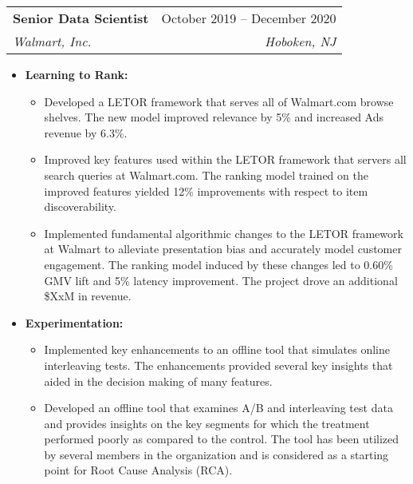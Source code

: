 \documentclass[letterpaper,11pt]{article}
\makeatletter
\newcommand{\resumeItem}[1]{
  \item\small{
    {#1 \vspace{-2pt}}
  }
}
\newcommand{\resumeSubheading}[4]{
  \vspace{-2pt}\item
    \begin{tabular*}{0.97\textwidth}[t]{l@{\extracolsep{\fill}}r}
      \textbf{#1} & #2 \\
      \textit{\small#3} & \textit{\small #4} \\
    \end{tabular*}\vspace{-7pt}
}
\newcommand{\resumeItemListStart}{\begin{itemize}}
\newcommand{\resumeItemListEnd}{\end{itemize}\vspace{-4.5pt}}
\makeatother
\begin{document}
      \vspace{2mm}
       \resumeSubheading
      {Senior Data Scientist}{October 2019 -- December 2020}
      {Walmart, Inc.}{Hoboken, NJ}
      \resumeItemListStart
        \resumeItem{{\bf Learning to Rank:} 
       \begin{itemize}
        \item Developed a LETOR framework that serves all of Walmart.com browse shelves. The new model improved relevance by 5\% and increased Ads revenue by 6.3\%.
        \item Improved key features used within the LETOR framework that servers all search queries at Walmart.com. The ranking model trained on the improved features yielded 12\% improvements with respect to item discoverability.
           \item Implemented fundamental algorithmic changes to the LETOR framework at Walmart to alleviate presentation bias and accurately model customer engagement. The ranking model induced by these changes led to 0.60\% GMV lift and 5\% latency improvement. The project drove an additional \$XxM in revenue.
        \end{itemize}
    }
        \resumeItem{{\bf Experimentation:}}
        \begin{itemize}
        \item Implemented key enhancements to an offline tool that simulates online interleaving tests. The enhancements provided several key insights that aided in the decision making of many features.
        \item Developed an offline tool that examines A/B and interleaving test data and provides insights on the key segments for which the treatment performed poorly as compared to the control. The tool has been utilized by several members in the organization and is considered as a starting point for Root Cause Analysis (RCA).
        	\end{itemize}
      \resumeItemListEnd
      
\end{document}

